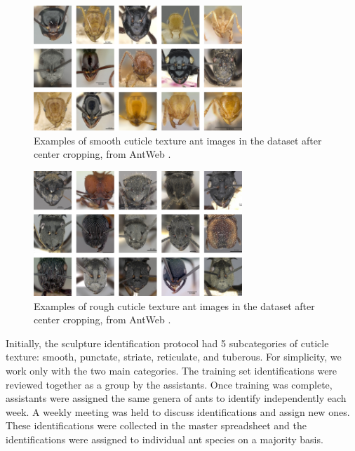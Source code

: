 \documentclass{aci}
\numberwithin{equation}{section}
\begin{document}
\begin{figure}
    \centering
    \includegraphics[width=0.7\textwidth]{assets/images/smooth_full_collage.png}
    \caption{Examples of smooth cuticle texture ant images in the dataset after
        center cropping, from AntWeb \cite{perrichot_antweb_2012}.}
    \label{fig:smooth-cuticle-texture}
\end{figure}

\begin{figure}
    \centering
    \includegraphics[width=0.7\textwidth]{assets/images/rough_full_collage.png}
    \caption{Examples of rough cuticle texture ant images in the dataset after
        center cropping, from AntWeb \cite{perrichot_antweb_2012}.}
    \label{fig:rough-cuticle-texture}
\end{figure}

Initially, the sculpture identification protocol had 5 subcategories of cuticle
texture: smooth, punctate, striate, reticulate, and tuberous. For simplicity, we
work only with the two main categories. The training set identifications were
reviewed together as a group by the assistants. Once training was complete,
assistants were assigned the same genera of ants to identify independently each
week. A weekly meeting was held to discuss identifications and assign new ones.
These identifications were collected in the master spreadsheet and the
identifications were assigned to individual ant species on a majority basis.
\end{document}
